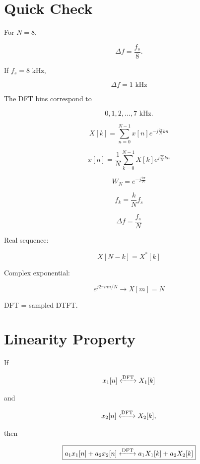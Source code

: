 \section{Quick Check}

For \(N=8\),

\[
\Delta f=\frac{f_s}{8}.
\]

If \(f_s=8\text{ kHz}\),

\[
\boxed{
\Delta f=1\text{ kHz}
}
\]

The DFT bins correspond to

\[
0,1,2,\ldots,7\text{ kHz}.
\]


\begin{tcolorbox}[title=One-Minute Revision,colback=blue!5]

\[
X[k]=
\sum_{n=0}^{N-1}
x[n]e^{-j\frac{2\pi}{N}kn}
\]

\[
x[n]=
\frac{1}{N}
\sum_{k=0}^{N-1}
X[k]e^{j\frac{2\pi}{N}kn}
\]

\[
W_N=e^{-j\frac{2\pi}{N}}
\]

\[
f_k=\frac{k}{N}f_s
\]

\[
\Delta f=\frac{f_s}{N}
\]

Real sequence:

\[
X[N-k]=X^*[k]
\]

Complex exponential:

\[
e^{j2\pi mn/N}\rightarrow
X[m]=N
\]

DFT = sampled DTFT.

\end{tcolorbox}
\section{Linearity Property}

If

\[
x_1[n]\xleftrightarrow{\text{DFT}}X_1[k]
\]

and

\[
x_2[n]\xleftrightarrow{\text{DFT}}X_2[k],
\]

then

\[
\boxed{
a_1x_1[n]+a_2x_2[n]
\xleftrightarrow{\text{DFT}}
a_1X_1[k]+a_2X_2[k]
}
\]


